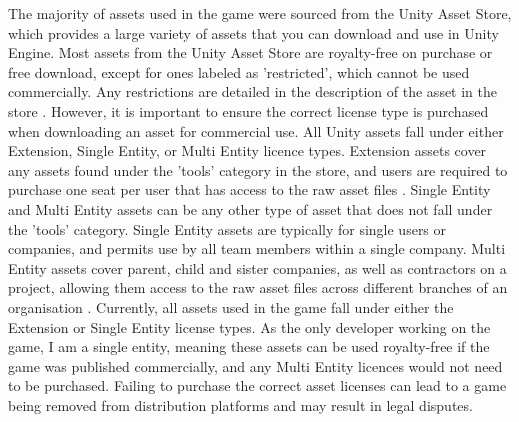 \documentclass[10pt]{final_report}
\begin{document}
The majority of assets used in the game were sourced from the Unity Asset Store, which provides a large variety of assets that you can download and use in Unity Engine. Most assets from the Unity Asset Store are royalty-free on purchase or free download, except for ones labeled as 'restricted', which cannot be used commercially. Any restrictions are detailed in the description of the asset in the store \cite{UnityCommercial}. However, it is important to ensure the correct license type is purchased when downloading an asset for commercial use.
All Unity assets fall under either Extension, Single Entity, or Multi Entity licence types. Extension assets cover any assets found under the 'tools' category in the store, and users are required to purchase one seat per user that has access to the raw asset files \cite{UnityLicences}. Single Entity and Multi Entity assets can be any other type of asset that does not fall under the 'tools' category. Single Entity assets are typically for single users or companies, and permits use by all team members within a single company. Multi Entity assets cover parent, child and sister companies, as well as contractors on a project, allowing them access to the raw asset files across different branches of an organisation \cite{UnityLicences}. Currently, all assets used in the game fall under either the Extension or Single Entity license types. As the only developer working on the game, I am a single entity, meaning these assets can be used royalty-free if the game was published commercially, and any Multi Entity licences would not need to be purchased. Failing to purchase the correct asset licenses can lead to a game being removed from distribution platforms and may result in legal disputes.
\end{document}
